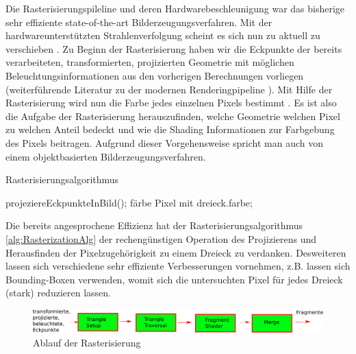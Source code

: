 Die Rasterisierungspileline und deren Hardwarebeschleunigung war das bisherige sehr effiziente \glqq state-of-the-art\grqq{} Bilderzeugungsverfahren. Mit der hardwareunterstützten 
Strahlenverfolgung scheint es sich nun zu aktuell zu verschieben \cite{Barre-Brisebois2019}. 
Zu Beginn der Rasterisierung haben wir die Eckpunkte der bereits verarbeiteten, transformierten, projizierten Geometrie mit möglichen
Beleuchtungsinformationen aus den vorherigen Berechnungen vorliegen (weiterführende Literatur zu der modernen
Renderingpipeline \cite{akenine2018real}). 
Mit Hilfe der Rasterisierung wird nun die Farbe jedes einzelnen Pixels bestimmt \cite{RasterisierungImplementierung}. Es ist also die Aufgabe der Rasterisierung herauszufinden, 
welche Geometrie welchen Pixel zu welchen Anteil bedeckt und wie die Shading Informationen zur Farbgebung des Pixels beitragen. 
Aufgrund dieser Vorgehensweise spricht man auch von einem objektbasierten Bilderzeugungsverfahren.

\begin{tcolorbox}
    \begin{algorithm}[H]
        \caption{Rasterisierungsalgorithmus}
        \begin{algorithmic}[1]
            \State projeziereEckpunkteInBild();
                \State färbe Pixel mit dreieck.farbe;
                \EndIf
            \EndFor
        \EndFor
        \EndProcedure
        \end{algorithmic}
        \label{alg:RasterizationAlg}
    \end{algorithm}
\end{tcolorbox}

Die bereits angesprochene Effizienz hat der Rasterisierungsalgorithmus \ref{alg:RasterizationAlg} der rechengünstigen Operation des Projizierens und Herausfinden 
der Pixelzugehörigkeit zu einem Dreieck zu verdanken. Desweiteren lassen sich verschiedene sehr effiziente Verbesserungen vornehmen, z.B. lassen sich Bounding-Boxen
verwenden, womit sich die untersuchten Pixel für jedes Dreieck (stark) reduzieren lassen. 

\begin{figure}[H]
    \begin{tcolorbox}
        \centering
        \includegraphics[width=\linewidth]{content/PathTracer/Bilder/Rasterisierung.pdf}
        \end{tcolorbox}
    \caption{Ablauf der Rasterisierung}
    \label{pic:Rasterisierungsablauf}
\end{figure}

